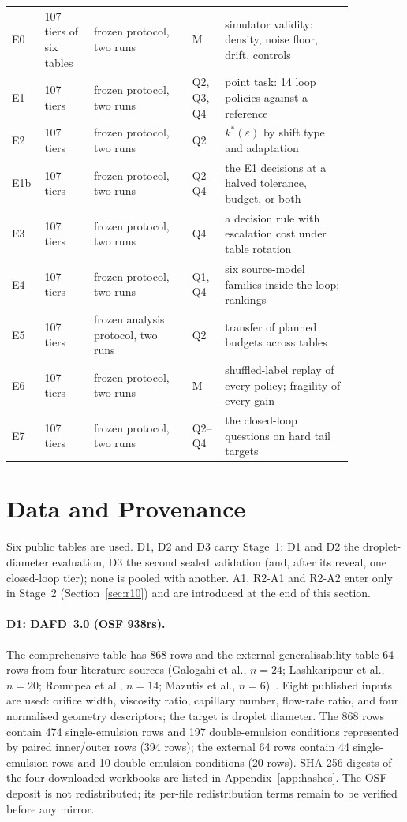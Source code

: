 \documentclass[11pt,a4paper]{article}
\begin{document}
\begin{table}[htbp]
\begin{tabular}{p{0.07\linewidth}p{0.13\linewidth}p{0.26\linewidth}p{0.06\linewidth}p{0.34\linewidth}}
E0 & 107 tiers of six tables & frozen protocol, two runs & M & simulator validity: density, noise floor, drift, controls \\
E1 & 107 tiers & frozen protocol, two runs & Q2, Q3, Q4 & point task: 14 loop policies against a reference \\
E2 & 107 tiers & frozen protocol, two runs & Q2 & $k^{*}(\varepsilon)$ by shift type and adaptation \\
E1b & 107 tiers & frozen protocol, two runs & Q2--Q4 & the E1 decisions at a halved tolerance, budget, or both \\
E3 & 107 tiers & frozen protocol, two runs & Q4 & a decision rule with escalation cost under table rotation \\
E4 & 107 tiers & frozen protocol, two runs & Q1, Q4 & six source-model families inside the loop; rankings \\
E5 & 107 tiers & frozen analysis protocol, two runs & Q2 & transfer of planned budgets across tables \\
E6 & 107 tiers & frozen protocol, two runs & M & shuffled-label replay of every policy; fragility of every gain \\
E7 & 107 tiers & frozen protocol, two runs & Q2--Q4 & the closed-loop questions on hard tail targets \\
\bottomrule
\end{tabular}
\end{table}

\section{Data and Provenance}
\label{sec:data}
Six public tables are used. D1, D2 and D3 carry Stage~1: D1 and D2 the
droplet-diameter evaluation, D3 the second sealed validation (and, after its
reveal, one closed-loop tier); none is pooled
with another. A1, R2-A1 and R2-A2 enter only in Stage~2 (Section~\ref{sec:r10})
and are introduced at the end of this section.

\paragraph{D1: DAFD~3.0 (OSF 938rs).} The comprehensive table has 868 rows and
the external generalisability table 64 rows from four literature sources
(Galogahi et al., $n=24$; Lashkaripour et al., $n=20$; Roumpea et al.,
$n=14$; Mazutis et al., $n=6$)~\cite{lashkaripour2024}. Eight published
inputs are used: orifice width, viscosity ratio, capillary number, flow-rate
ratio, and four normalised geometry descriptors; the target is droplet
diameter. The 868 rows contain 474 single-emulsion rows and 197
double-emulsion conditions represented by paired inner/outer rows (394 rows);
the external 64 rows contain 44 single-emulsion rows and 10 double-emulsion
conditions (20 rows). SHA-256 digests of the four downloaded workbooks are
listed in Appendix~\ref{app:hashes}. The OSF deposit is not redistributed; its
per-file redistribution terms remain to be verified before any mirror.
\end{document}

